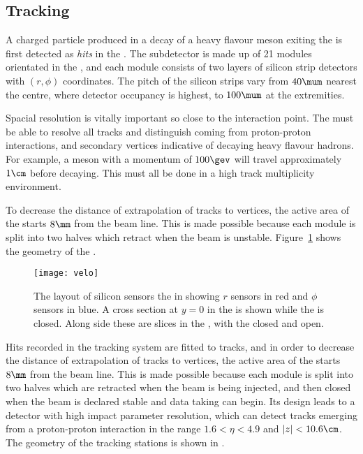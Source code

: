 \subsection{Tracking}

A charged particle produced in a decay of a heavy flavour meson exiting the \pv is first detected
as \emph{hits} in the \velo.
The \velo subdetector is made up of 21 modules orientated in the , and
each module consists of two layers of silicon strip detectors with $(r,\phi)$ coordinates.
The pitch of the silicon strips vary from \approx$40\mum$ nearest the centre, where detector occupancy
is highest, to \approx$100\mum$ at the extremities.

Spacial resolution is vitally important so close to the interaction point.
The \velo must be able to resolve all tracks and distinguish  coming from
proton-proton interactions, and secondary vertices indicative of decaying heavy flavour hadrons.
For example, a \Bp meson with a momentum of $100\gev$ will travel approximately $1\cm$ before decaying.
This must all be done in a high track multiplicity environment.


To decrease the distance of extrapolation of tracks to vertices,
the active area of the \velo starts $8\mm$ from the beam line.
This is made possible because each module is split into two halves which retract when the \lhc beam
is unstable.
Figure~\ref{fig:lhcb:velo} shows the geometry of the \velo.

\begin{figure}
  \begin{center}
    \texttt{[image: velo]}
  \end{center}
  \caption[Diagram of the LHCb Vertex Locator]
  {\small
    The layout of silicon sensors the \velo in showing $r$ sensors in red and $\phi$ sensors in
    blue.
    A cross section at $y=0$ in the  is shown while the \velo is closed.
    Along side these are slices in the , with the \velo closed and open.
  }
  \label{fig:lhcb:velo}
\end{figure}

Hits recorded in the tracking system are fitted to tracks, and in order to decrease the
distance of extrapolation of tracks to vertices,
the active area of the \velo starts $8\mm$ from the beam line.
This is made possible because each module is split into two halves which are retracted when the
\lhc beam is being injected, and then closed when the beam is declared stable and data taking can
begin.
Its design leads to a detector with high impact parameter resolution, which can detect tracks
emerging from a proton-proton interaction in the range $1.6<\eta<4.9$ and $|z|<10.6\cm$.
The geometry of the tracking stations is shown in .

